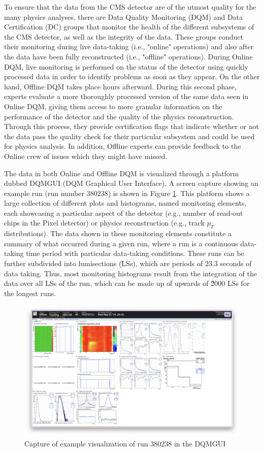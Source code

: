 To ensure that the data from the CMS detector are of the utmost quality for the many physics analyses, there are Data Quality Monitoring (DQM) and Data Certification (DC) groups that monitor the health of the different subsystems of the CMS detector, as well as the integrity of the data. These groups conduct their monitoring during live data-taking (i.e., "online" operations) and also after the data have been fully reconstructed (i.e., "offline" operations). During Online DQM, live monitoring is performed on the status of the detector using quickly processed data in order to identify problems as soon as they appear. On the other hand, Offline DQM takes place hours afterward. During this second phase, experts evaluate a more thoroughly processed version of the same data seen in Online DQM, giving them access to more granular information on the performance of the detector and the quality of the physics reconstruction. Through this process, they provide certification flags that indicate whether or not the data pass the quality check for their particular subsystem and could be used for physics analysis. In addition, Offline experts can provide feedback to the Online crew of issues which they might have missed.

The data in both Online and Offline DQM is visualized through a platform dubbed DQMGUI (DQM Graphical User Interface). A screen capture showing an example run (run number 380238) is shown in Figure \ref{fig:dqmgui}. This platform shows a large collection of different plots and histograms, named monitoring elements, each showcasing a particular aspect of the detector (e.g., number of read-out chips in the Pixel detector) or physics reconstruction (e.g., track $p_T$ distributions). The data shown in these monitoring elements constitute a summary of what occurred during a given run, where a run is a continuous data-taking time period with particular data-taking conditions. These runs can be further subdivided into lumisections (LSs), which are periods of 23.3 seconds of data taking. Thus, most monitoring histograms result from the integration of the data over all LSs of the run, which can be made up of upwards of \~2000 LSs for the longest runs.

\begin{figure}
    \centering
    \includegraphics[width=0.8\linewidth]{images/dqmgui.png}
    \caption{Capture of example visualization of run 380238 in the DQMGUI}
    \label{fig:dqmgui}
\end{figure}